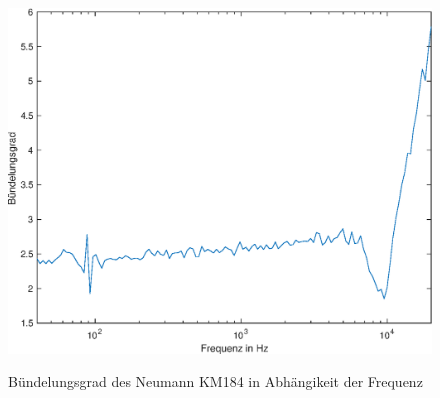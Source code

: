 \begin{figure}[H]
        \centering
        \includegraphics[width=0.8\linewidth]{Figures/Buendelungsgrad}
        \label{fig:buendel}
    \caption{Bündelungsgrad des Neumann KM184 in Abhängikeit der Frequenz}
\end{figure}






